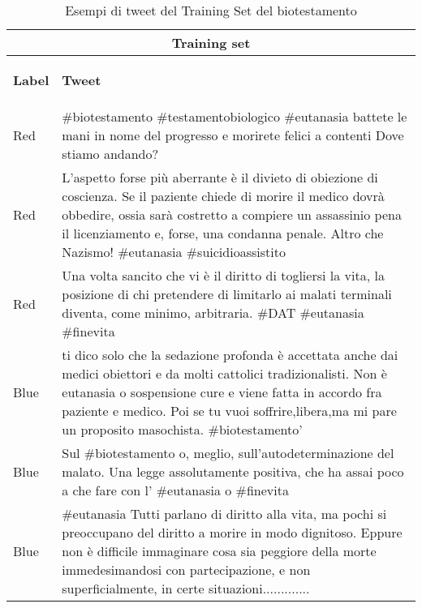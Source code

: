 \begin{table}

\begin{tabular}{ |p{3cm}|p{10cm}| }
 \hline
 \multicolumn{2}{|c|}{\textbf{Training set}} \\
 \hline 
 \begin{center}
 \textbf{Label}
 \end{center} & \begin{center}
 \textbf{Tweet}
 \end{center}\\
 \hline
 Red   & \#biotestamento \#testamentobiologico \#eutanasia battete le mani in nome del progresso e morirete felici a contenti Dove stiamo andando?\\ \hline
 Red & L'aspetto forse più aberrante è il divieto di obiezione di coscienza. Se il paziente chiede di morire il medico dovrà obbedire, ossia sarà costretto a compiere un assassinio pena il licenziamento e, forse, una condanna penale. Altro che Nazismo! \#eutanasia \#suicidioassistito \\ \hline
 Red & Una volta sancito che vi è il diritto di togliersi la vita, la posizione di chi pretendere di limitarlo ai malati terminali diventa, come minimo, arbitraria. \#DAT \#eutanasia \#finevita \\ \hline 
 Blue & ti dico solo che la sedazione profonda è accettata anche dai medici obiettori e da molti cattolici tradizionalisti. Non è eutanasia o sospensione cure e viene fatta in accordo fra paziente e medico. Poi se tu vuoi soffrire,libera,ma mi pare un proposito masochista. \#biotestamento'  \\ \hline
Blue & Sul \#biotestamento o, meglio, sull'autodeterminazione del malato. Una legge assolutamente positiva, che ha assai poco a che fare con l' \#eutanasia o \#finevita \\ \hline
Blue & \#eutanasia Tutti parlano di diritto alla vita, ma pochi si preoccupano del diritto a morire in modo dignitoso. Eppure non è difficile immaginare cosa sia peggiore della morte immedesimandosi con partecipazione, e non superficialmente, in certe situazioni.............\\
 \hline
\end{tabular}
\caption{Esempi di tweet del Training Set del biotestamento}
 \label{trainingSetExampleBio}
\end{table}

